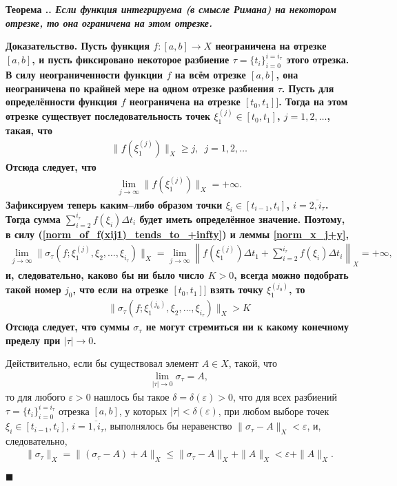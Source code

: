 \documentclass{report}
\newcounter{rem}[section]
\newcounter{theor}[section]
\renewcommand{\thetheor}{\thesection.\arabic{theor}}
\newenvironment{Theorem}{\par\refstepcounter{theor}\bf Теорема \thetheor. \it}{\rm\par}
\newenvironment{Proof}{\par\noindent\bf Доказательство.\rm}{ $\blacksquare$\par}
\begin{document}
\begin{Theorem}
Если функция интегрируема (в смысле Римана) на некотором отрезке, то она ограничена на этом отрезке.
\end{Theorem}
\begin{Proof}
Пусть функция $f\colon[a,b]\to X$ неограничена на отрезке $[a,b]$, и пусть фиксировано некоторое разбиение $\tau=\{t_i\}_{i=0}^{i=i_{\tau}}$ этого отрезка. В силу неограниченности функции
$f$ на всём отрезке $[a,b]$, она неограничена по крайней мере на одном отрезке разбиения $\tau$. Пусть для определённости функция $f$ неограничена на отрезке $[t_0,t_1]]$. Тогда на этом
отрезке существует последовательность точек $\xi^{(j)}_1\in[t_0,t_1]$, $j=1,2,\dots$, такая, что
\begin{gather*}
\|f(\xi^{(j)}_1)\|_X\geqslant j,\,\,\,j=1,2,\dots
\end{gather*}
Отсюда следует, что
\begin{gather}\label{norm_of_f(xij1)_tends_to_+infty}
\lim\limits_{j\to\infty}\|f(\xi^{(j)}_1)\|_X=+\infty.
\end{gather}
Зафиксируем теперь каким--либо образом точки $\xi_i\in[t_{i-1},t_i]$, $i=\overline{2,i_\tau}$. Тогда сумма $\sum\limits_{i=2}^{i_\tau}f(\xi_i)\Delta t_i$ будет иметь определённое значение.
Поэтому, в силу (\ref{norm_of_f(xij1)_tends_to_+infty}) и леммы \ref{norm_x_j+y},
\begin{gather*}
\lim\limits_{j\to\infty}\|\sigma_{\tau}(f;\xi^{(j)}_1,\xi_2,\dots,\xi_{i_{\tau}})\|_X=
\lim\limits_{j\to\infty}\left\|f(\xi^{(j)}_1)\Delta t_1+\sum\limits_{i=2}^{i_\tau}f(\xi_i)\Delta t_i\right\|_X=+\infty,
\end{gather*}
и, следовательно, каково бы ни было число $K>0$, всегда можно подобрать такой номер $j_0$, что если на отрезке $[t_0,t_1]]$ взять точку
$\xi^{(j_0)}_1$, то
\begin{gather*}
\|\sigma_{\tau}(f;\xi^{(j_0)}_1,\xi_2,\dots,\xi_{i_{\tau}})\|_X>K
\end{gather*}
Отсюда следует, что суммы $\sigma_{\tau}$ не могут стремиться ни к какому конечному пределу при $|\tau|\to0$.

Действительно, если бы существовал элемент $A\in X$, такой, что
\begin{gather*}
\lim\limits_{|\tau|\to0}\sigma_\tau=A,
\end{gather*}
то для любого $\varepsilon>0$ нашлось бы такое $\delta=\delta(\varepsilon)>0$, что для всех разбиений $\tau=\{t_i\}_{i=0}^{i=i_{\tau}}$ отрезка $[a,b]$, у которых
$|\tau|<\delta(\varepsilon)$, при любом выборе точек $\xi_i\in[t_{i-1},t_i]$, $i=\overline{1,i_\tau}$, выполнялось бы неравенство $\|\sigma_\tau-A\|_X<\varepsilon$, и, следовательно,
\begin{gather*}
\|\sigma_\tau\|_X=\|(\sigma_\tau-A)+A\|_X\leqslant\|\sigma_\tau-A\|_X+\|A\|_X<\varepsilon+\|A\|_X.
\end{gather*}


\end{Proof}
\end{document}
